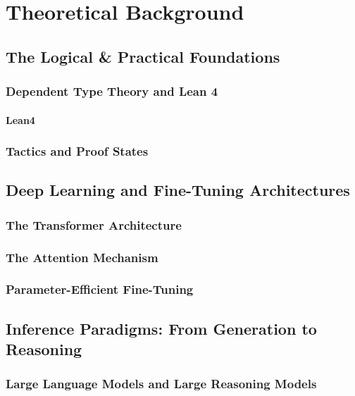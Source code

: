 \chapter[Theoretical Background]{Theoretical Background}

\section{The Logical \& Practical Foundations}

\subsection{Dependent Type Theory and Lean 4}

\subsubsection{Lean4}

\subsection{Tactics and Proof States}

\section{Deep Learning and Fine-Tuning Architectures}

\subsection{The Transformer Architecture}

\subsection{The Attention Mechanism}

\subsection{Parameter-Efficient Fine-Tuning}

\section{Inference Paradigms: From Generation to Reasoning}

\subsection{Large Language Models and Large Reasoning Models}

